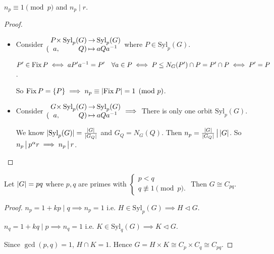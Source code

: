 \begin{theorem}
  $n_p \equiv 1 \pmod p$ and $n_p \mid r$.
  \begin{proof}
    \begin{itemize}
      \item Consider $\arraycolsep=1pt \begin{array}{ccrcl}
          &P \times &\text{Syl}_p(G) & \to & \text{Syl}_p(G) \\
          (&a, &Q) & \mapsto & aQa^{-1}
        \end{array}$ where $P \in \text{Syl}_p(G)$.

        $P' \in \operatorname{Fix} P \iff aP'a^{-1} = P' \quad \forall a \in P
        \iff P \le N_G(P') \cap P = P' \cap P \iff P' = P$.

        So $\operatorname{Fix} P = \{ P \} \implies n_p \equiv \lvert\operatorname{Fix} P\rvert = 1 \pmod p$.

      \item Consider $\arraycolsep=1pt \begin{array}{ccrcl}
          &G \times &\text{Syl}_p(G) & \to & \text{Syl}_p(G) \\
          (&a, &Q) & \mapsto & aQa^{-1}
        \end{array} \implies$ There is only one orbit $\text{Syl}_p(G)$.
        
        We know $\lvert\text{Syl}_p(G)\rvert = \frac{\lvert G\rvert}{\lvert G_Q\rvert}$
        and $G_Q = N_G(Q)$. Then $n_p = \frac{\lvert G\rvert}{\lvert G_Q\rvert} \,\big|\, \lvert G\rvert$.
        So $n_p \,\big|\, p^\alpha r \implies n_p \,\big|\, r$.
    \end{itemize}
  \end{proof}
\end{theorem}

\begin{prop}
  Let $\lvert G\rvert = pq$ where $p, q$ are primes with $\begin{cases}
    p < q \\
    q \not\equiv 1 \pmod p.
  \end{cases}$
  Then $G \cong C_{pq}$.
  \begin{proof}
    $n_p = 1+kp \mid q \implies n_p = 1$ i.e.
    $H \in \text{Syl}_p(G) \implies H \lhd G$.

    $n_q = 1+kq \mid p \implies n_q = 1$ i.e.
    $K \in \text{Syl}_q(G) \implies K \lhd G$.

    Since $\gcd(p, q) = 1$, $H \cap K = 1$.
    Hence $G = H \times K \cong C_p \times C_q \cong C_{pq}$.
  \end{proof}
\end{prop}

